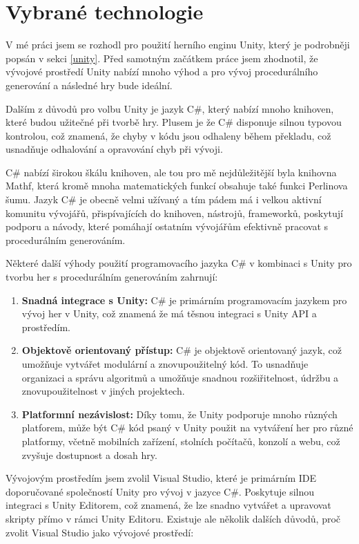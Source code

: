 \section{Vybrané technologie}
V mé práci jsem se rozhodl pro použití herního enginu Unity, který je podrobněji popsán v sekci \ref{unity}. Před samotným začátkem práce jsem zhodnotil, že vývojové prostředí Unity nabízí mnoho výhod a pro vývoj procedurálního generování a následné hry bude ideální.

Dalším z důvodů pro volbu Unity je jazyk C\#, který nabízí mnoho knihoven, které budou užitečné při tvorbě hry. Plusem je že C\# disponuje silnou typovou kontrolou, což znamená, že chyby v kódu jsou odhaleny během překladu, což usnadňuje odhalování a opravování chyb při vývoji.

C\# nabízí širokou škálu knihoven, ale tou pro mě nejdůležitější byla knihovna Mathf, která kromě mnoha matematických funkcí obsahuje také funkci Perlinova šumu. Jazyk C\# je obecně velmi užívaný a tím pádem má i velkou aktivní komunitu vývojářů, přispívajících do knihoven, nástrojů, frameworků, poskytují podporu a návody, které pomáhají ostatním vývojářům efektivně pracovat s procedurálním generováním. 

Některé další výhody použití programovacího jazyka C\# v kombinaci s Unity pro tvorbu her s procedurálním generováním zahrnují:

\begin{enumerate}
	\item \textbf{Snadná integrace s Unity:} C\# je primárním programovacím jazykem pro vývoj her v Unity, což znamená že má těsnou integraci s Unity API a prostředím.
	\item \textbf{Objektově orientovaný přístup:} C\# je objektově orientovaný jazyk, což umožňuje vytvářet modulární a znovupoužitelný kód. To usnadňuje organizaci a správu algoritmů a umožňuje snadnou rozšiřitelnost, údržbu a znovupoužitelnost v jiných projektech.
	\item \textbf{Platformní nezávislost:} Díky tomu, že Unity podporuje mnoho různých platforem, může být C\# kód psaný v Unity použit na vytváření her pro různé platformy, včetně mobilních zařízení, stolních počítačů, konzolí a webu, což zvyšuje dostupnost a dosah hry.
\end{enumerate}

Vývojovým prostředím jsem zvolil Visual Studio, které je primárním IDE doporučované společností Unity pro vývoj v jazyce C\#. Poskytuje silnou integraci s Unity Editorem, což znamená, že lze snadno vytvářet a upravovat skripty přímo v rámci Unity Editoru. Existuje ale několik dalších důvodů, proč zvolit Visual Studio jako vývojové prostředí:
 
